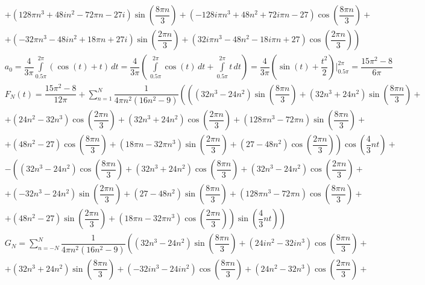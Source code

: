 \documentclass[a4paper, 16pt]{article}
\begin{document}
\begin{align*}
    & +\left(128{\pi}n^3+48in^2-72{\pi}n-27i\right)\sin\left(\dfrac{8{\pi}n}{3}\right)+\left(-128i{\pi}n^3+48n^2+72i{\pi}n-27\right)\cos\left(\dfrac{8{\pi}n}{3}\right)+\\
    & \left.+\left(-32{\pi}n^3-48in^2+18{\pi}n+27i\right)\sin\left(\dfrac{2{\pi}n}{3}\right)+\left(32i{\pi}n^3-48n^2-18i{\pi}n+27\right)\cos\left(\dfrac{2{\pi}n}{3}\right)\right)\\
    & a_0=\dfrac{4}{3\pi}\int\limits_{0.5\pi}^{2\pi}\left(\cos{\left(t\right)}+t\right)\,dt=\dfrac{4}{3\pi}\left(\,\int\limits_{0.5\pi}^{2\pi}\cos{(t)}\,dt+\int\limits_{0.5\pi}^{2\pi}t\,dt\right)=\dfrac{4}{3\pi}\left(\sin{(t)}+\dfrac{t^2}{2}\right)\bigg|_{0.5\pi}^{2\pi}=\dfrac{15\pi^2-8}{6\pi}\\
    & F_N(t)=\dfrac{15\pi^2-8}{12\pi}+\sum_{n=1}^{N}\dfrac{1}{4{\pi}n^2\left(16n^2-9\right)}\left(\left(\left(32n^3-24n^2\right)\sin\left(\dfrac{8{\pi}n}{3}\right)+\left(32n^3+24n^2\right)\sin\left(\dfrac{8{\pi}n}{3}\right)+\right.\right.\\
    & +\left(24n^2-32n^3\right)\cos\left(\dfrac{2{\pi}n}{3}\right)+\left(32n^3+24n^2\right)\cos\left(\dfrac{2{\pi}n}{3}\right)+\left(128{\pi}n^3-72{\pi}n\right)\sin\left(\dfrac{8{\pi}n}{3}\right)+\\
    & \left.+\left(48n^2-27\right)\cos\left(\dfrac{8{\pi}n}{3}\right)+\left(18{\pi}n-32{\pi}n^3\right)\sin\left(\dfrac{2{\pi}n}{3}\right)+\left(27-48n^2\right)\cos\left(\dfrac{2{\pi}n}{3}\right)\right)\cos{\left(\dfrac{4}{3}nt\right)}+\\
    & -\left(\left(32n^3-24n^2\right)\cos\left(\dfrac{8{\pi}n}{3}\right)+\left(32n^3+24n^2\right)\cos\left(\dfrac{8{\pi}n}{3}\right)+\left(32n^3-24n^2\right)\cos\left(\dfrac{2{\pi}n}{3}\right)\right.+\\
    & +\left(-32n^3-24n^2\right)\sin\left(\dfrac{2{\pi}n}{3}\right)+\left(27-48n^2\right)\sin\left(\dfrac{8{\pi}n}{3}\right)+\left(128{\pi}n^3-72{\pi}n\right)\cos\left(\dfrac{8{\pi}n}{3}\right)+\\
    & \left.\left.+\left(48n^2-27\right)\sin\left(\dfrac{2{\pi}n}{3}\right)+\left(18{\pi}n-32{\pi}n^3\right)\cos\left(\dfrac{2{\pi}n}{3}\right)\right)\sin{\left(\dfrac{4}{3}nt\right)}\right)\\
    & G_N=\sum_{n=-N}^{N}\dfrac{1}{4{\pi}n^2\left(16n^2-9\right)}\left(\left(32n^3-24n^2\right)\sin\left(\dfrac{8{\pi}n}{3}\right)+\left(24in^2-32in^3\right)\cos\left(\dfrac{8{\pi}n}{3}\right)+\right.\\
    & +\left(32n^3+24n^2\right)\sin\left(\dfrac{8{\pi}n}{3}\right)+\left(-32in^3-24in^2\right)\cos\left(\dfrac{8{\pi}n}{3}\right)+\left(24n^2-32n^3\right)\cos\left(\dfrac{2{\pi}n}{3}\right)+\\

\end{align*}
\end{document}
